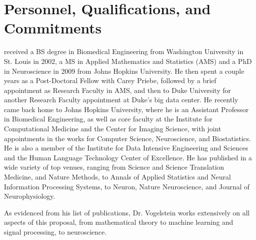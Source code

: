 
\section{Personnel, Qualifications, and Commitments}





 received a BS degree in Biomedical Engineering from Washington University in St. Louis in 2002, a MS in Applied Mathematics and Statistics (AMS) and a PhD in Neuroscience in 2009 from Johns Hopkins University. He then spent a couple years as a Post-Doctoral Fellow with Carey Priebe, followed by a brief appointment as Research Faculty in AMS, and then to Duke University for another Research Faculty appointment at Duke's big data center.  He recently came back home to Johns Hopkins University, where he is an Assistant Professor in Biomedical Engineering, as well as core faculty at the Institute for Computational Medicine and the Center for Imaging Science, with joint appointments in the works for Computer Science, Neuroscience, and Biostatistics.  He is also a member of the Institute for Data Intensive Engineering and Sciences and the Human Language Technology Center of Excellence.  He has published in a wide variety of top venues, ranging from Science and Science Translation Medicine, and Nature Methods, to Annals of Applied Statistics and Neural Information Processing Systems,   to Neuron, Nature Neuroscience, and Journal of Neurophysiology.

As evidenced from his list of publications, Dr. Vogelstein works extensively on all aspects of this proposal, from mathematical theory to machine learning and signal processing, to neuroscience.



